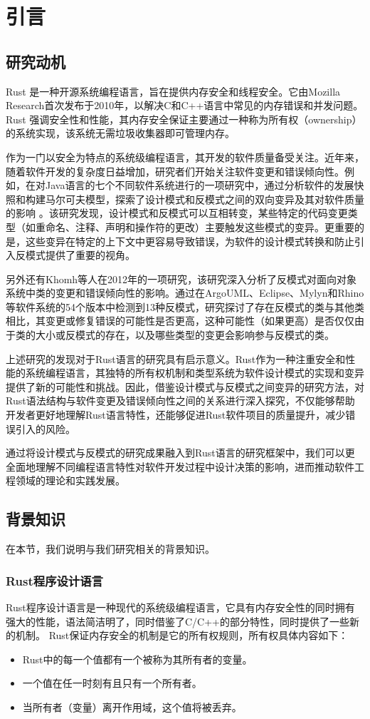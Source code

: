 \chapter{引言}
\section{研究动机}

Rust 是一种开源系统编程语言，旨在提供内存安全和线程安全。它由Mozilla Research首次发布于2010年，以解决C和C++语言中常见的内存错误和并发问题。Rust 强调安全性和性能，其内存安全保证主要通过一种称为所有权（ownership）的系统实现，该系统无需垃圾收集器即可管理内存。

作为一门以安全为特点的系统级编程语言，其开发的软件质量备受关注。近年来，随着软件开发的复杂度日益增加，研究者们开始关注软件变更和错误倾向性。例如，在对Java语言的七个不同软件系统进行的一项研究中，通过分析软件的发展快照和构建马尔可夫模型，探索了设计模式和反模式之间的双向变异及其对软件质量的影响 \cite{kermansaravi2021investigating}。该研究发现，设计模式和反模式可以互相转变，某些特定的代码变更类型（如重命名、注释、声明和操作符的更改）主要触发这些模式的变异。更重要的是，这些变异在特定的上下文中更容易导致错误，为软件的设计模式转换和防止引入反模式提供了重要的视角。

另外还有Khomh等人在2012年的一项研究\cite{khomh2012exploratory}，该研究深入分析了反模式对面向对象系统中类的变更和错误倾向性的影响。通过在ArgoUML、Eclipse、Mylyn和Rhino等软件系统的54个版本中检测到13种反模式，研究探讨了存在反模式的类与其他类相比，其变更或修复错误的可能性是否更高，这种可能性（如果更高）是否仅仅由于类的大小或反模式的存在，以及哪些类型的变更会影响参与反模式的类。

上述研究的发现对于Rust语言的研究具有启示意义。Rust作为一种注重安全和性能的系统编程语言，其独特的所有权机制和类型系统为软件设计模式的实现和变异提供了新的可能性和挑战。因此，借鉴设计模式与反模式之间变异的研究方法，对Rust语法结构与软件变更及错误倾向性之间的关系进行深入探究，不仅能够帮助开发者更好地理解Rust语言特性，还能够促进Rust软件项目的质量提升，减少错误引入的风险。

通过将设计模式与反模式的研究成果融入到Rust语言的研究框架中，我们可以更全面地理解不同编程语言特性对软件开发过程中设计决策的影响，进而推动软件工程领域的理论和实践发展。

\section{背景知识}
在本节，我们说明与我们研究相关的背景知识。
\subsection{Rust程序设计语言}
Rust程序设计语言是一种现代的系统级编程语言，它具有内存安全性的同时拥有强大的性能，语法简洁明了，同时借鉴了C/C++的部分特性，同时提供了一些新的机制。
Rust保证内存安全的机制是它的所有权规则，所有权具体内容如下：
\begin{itemize}
    \item Rust中的每一个值都有一个被称为其所有者的变量。
    \item 一个值在任一时刻有且只有一个所有者。
    \item 当所有者（变量）离开作用域，这个值将被丢弃。
\end{itemize}

